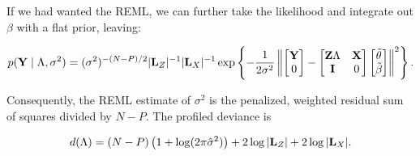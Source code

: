 \documentclass[10pt]{article}
\begin{document}
If we had wanted the REML, we can further take the likelihood and
integrate out $\beta$ with a flat prior, leaving:

\begin{equation*}
p({\bf Y} \mid \Lambda, \sigma^2) = (\sigma^2)^{-(N - P) / 2} |{\bf
  L}_Z|^{-1} |{\bf L}_X|^{-1}\exp\left\{-\frac{1}{2\sigma^2}
\left\|
\begin{bmatrix} {\bf Y} \\ 0 \end{bmatrix}
-\begin{bmatrix}{\bf Z}\Lambda & {\bf X} \\ {\bf I} & 0 \end{bmatrix}
\begin{bmatrix}\tilde\theta \\ \tilde\beta\end{bmatrix}
\right\|^2
\right\}.
\end{equation*}

Consequently, the REML estimate of $\sigma^2$ is the penalized,
weighted residual sum of squares divided by $N - P$. The profiled
deviance is

\begin{equation*}
d(\Lambda) = (N - P)\left(1 + \log(2\pi\hat\sigma^2)\right)+2\log|{\bf
  L}_Z| + 2\log|{\bf L}_X|.
\end{equation*}

\newpage
\end{document}
